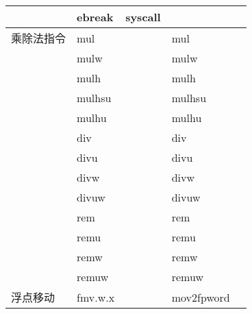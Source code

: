 \begin{longtable}{lllll}
                               & ebreak                           & syscall                      &                                \\
                               \hline
    乘除法指令                      & mul                              &                              & mul                            \\
                               & mulw                             &                              & mulw                           \\
                               & mulh                             &                              & mulh                           \\
                               & mulhsu                           &                              & mulhsu                         \\
                               & mulhu                            &                              & mulhu                          \\
                               & div                              &                              & div                            \\
                               & divu                             &                              & divu                           \\
                               & divw                             &                              & divw                           \\
                               & divuw                            &                              & divuw                          \\
                               & rem                              &                              & rem                            \\
                               & remu                             &                              & remu                           \\
                               & remw                             &                              & remw                           \\
                               & remuw                            &                              & remuw                          \\
                               \hline
    浮点移动                       & fmv.w.x                          &                              & mov2fpword                     \\

\end{longtable}
